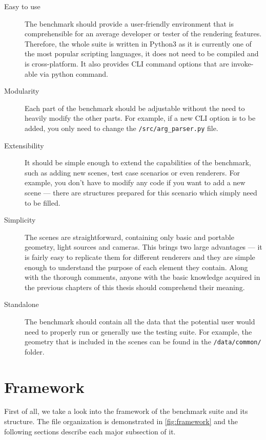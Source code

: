 \begin{description}
	\item[Easy to use] The benchmark should provide a user-friendly environment that is comprehensible for an average developer or tester of the rendering features. Therefore, the whole suite is written in Python3 as it is currently one of the most popular scripting languages, it does not need to be compiled and is cross-platform. It also provides CLI command options that are invoke-able via python command.
	\item[Modularity] Each part of the benchmark should be adjustable without the need to heavily modify the other parts. For example, if a new CLI option is to be added, you only need to change the \texttt{/src/arg\_parser.py} file.
	\item[Extensibility] It should be simple enough to extend the capabilities of the benchmark, such as adding new scenes, test case scenarios or even renderers. For example, you don't have to modify any code if you want to add a new scene --- there are structures prepared for this scenario which simply need to be filled.
	\item[Simplicity] The scenes are straightforward, containing only basic and portable geometry, light sources and cameras. This brings two large advantages --- it is fairly easy to replicate them for different renderers and they are simple enough to understand the purpose of each element they contain. Along with the thorough comments, anyone with the basic knowledge acquired in the previous chapters of this thesis should comprehend their meaning.
	\item[Standalone] The benchmark should contain all the data that the potential user would need to properly run or generally use the testing suite. For example, the geometry that is included in the scenes can be found in the \texttt{/data/common/} folder.
\end{description}

\section{Framework}

First of all, we take a look into the framework of the benchmark suite and its structure. The file organization is demonstrated in \autoref{fig:framework} and the following sections describe each major subsection of it.

